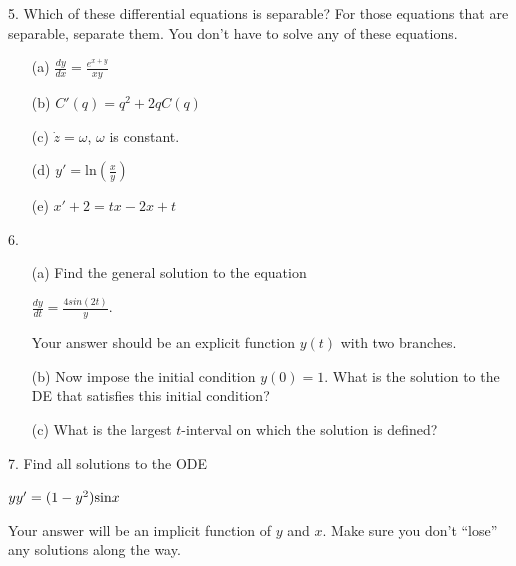 \documentclass[12pt,letterpaper]{hmcpset}
\begin{document}
\begin{problem}
5. Which of these differential equations is separable? For those equations that are separable,
separate them. You don’t have to solve any of these equations.\\
\begin{enumerate}
    \item[(a)] $\frac{dy}{dx}=\frac{e^{x+y}}{xy}$
    \item[(b)] $C'(q)=q^2+2qC(q)$
    \item[(c)] $\dot{z}=\omega$, $\omega$ is constant.
    \item[(d)] $y'=$ln$(\frac{x}{y})$
    \item[(e)] $x'+2=tx-2x+t$
\end{enumerate}

\end{problem}
\newpage
\begin{problem}
6. 
\begin{enumerate}
    \item[(a)] Find the general solution to the equation\\
\begin{center}
    $\frac{dy}{dt}=\frac{4sin(2t)}{y}$.
\end{center}
Your answer should be an explicit function $y(t)$ with two branches.
    \item[(b)] Now impose the initial condition $y(0) = 1$. What is the solution to the DE that satisfies
this initial condition?
    \item[(c)] What is the largest $t$-interval on which the solution is defined?
\end{enumerate}

\end{problem}
\newpage

\begin{problem}
7. Find all solutions to the ODE
\begin{center}
    $yy'=(1-y^2)\textnormal{sin}x$
\end{center}
Your answer will be an implicit function of $y$ and $x$. Make sure you don’t “lose” any solutions
along the way.
\end{problem}
\newpage
\end{document}
